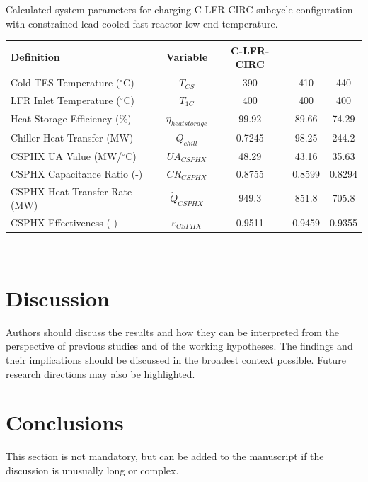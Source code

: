 \begin{paracol}{2}
\begin{specialtable}[H]
    \caption{Calculated system parameters for charging C-LFR-CIRC subcycle configuration with constrained lead-cooled fast reactor low-end temperature.\label{tab-c-lfr-circ}}
    \begin{tabular}{lcccc}
    \toprule
    \textbf{Definition} & \textbf{Variable} & \textbf{C-LFR-CIRC} &\\
    \midrule	
    Cold TES Temperature ($^{\circ}$C)	&	$T_{CS}$	&	390	&	410	&	440	\\
    LFR Inlet Temperature ($^{\circ}$C)	&	$T_{1C}$	&	400	&	400	&	400	\\
    Heat Storage Efficiency (\%)	&	$\eta_{heatstorage}$	&	99.92	&	89.66	&	74.29	\\
    Chiller Heat Transfer (MW)	&	$\dot{Q}_{chill}$	&	0.7245	&	98.25	&	244.2	\\
    CSPHX UA Value (MW/$^{\circ}$C)	&	$UA_{CSPHX}$	&	48.29	&	43.16	&	35.63	\\
    CSPHX Capacitance Ratio (-)	&	$CR_{CSPHX}$	&	0.8755	&	0.8599	&	0.8294	\\
    CSPHX Heat Transfer Rate (MW)	&	$\dot{Q}_{CSPHX}$	&	949.3	&	851.8	&	705.8	\\
    CSPHX Effectiveness (-)	&	$\varepsilon_{CSPHX}$	&	0.9511	&	0.9459	&	0.9355	\\
    \bottomrule
    \end{tabular}\\
\end{specialtable}






\section{Discussion}

Authors should discuss the results and how they can be interpreted from the perspective of previous studies and of the working hypotheses. The findings and their implications should be discussed in the broadest context possible. Future research directions may also be highlighted.

\section{Conclusions}

This section is not mandatory, but can be added to the manuscript if the discussion is unusually long or complex.

\end{paracol}

